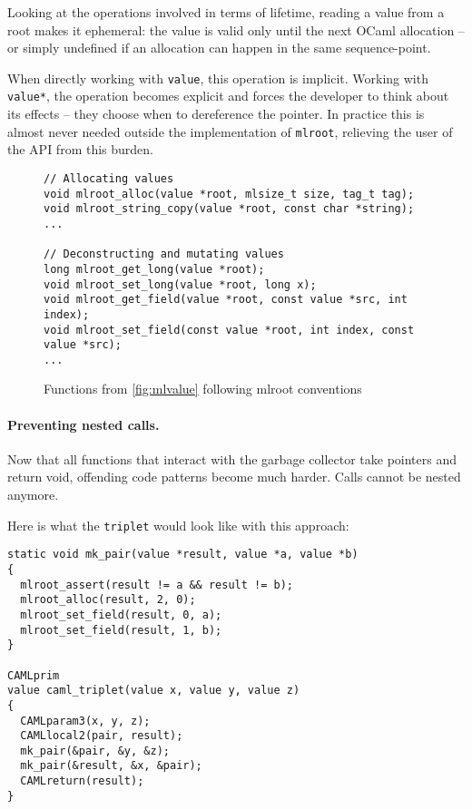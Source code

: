 \documentclass[a4paper]{easychair}
\newcommand{\cpp}[1]{\lstinline[style=C++]{#1}}
\begin{document}
Looking at the operations involved in terms of lifetime, reading a value
from a root makes it ephemeral: the value is valid only until the next
OCaml allocation -- or simply undefined if an allocation can happen in
the same sequence-point.

When directly working with \cpp{value}, this operation is implicit.
Working with \cpp{value*}, the operation becomes explicit and forces
the developer to think about its effects -- they choose when to
dereference the pointer.
In practice this is almost never needed outside the implementation of
\cpp{mlroot}, relieving the user of the API from this burden.

\begin{figure}[htbp]
\begin{lstlisting}[style=C++]
// Allocating values
void mlroot_alloc(value *root, mlsize_t size, tag_t tag);
void mlroot_string_copy(value *root, const char *string);
...
    
// Deconstructing and mutating values
long mlroot_get_long(value *root);
void mlroot_set_long(value *root, long x);
void mlroot_get_field(value *root, const value *src, int index);
void mlroot_set_field(const value *root, int index, const value *src);
...
\end{lstlisting}
  \caption{Functions from \ref{fig:mlvalue} following mlroot conventions}
  \label{fig:mlroot}
\end{figure}

\paragraph{Preventing nested calls.}

Now that all functions that interact with the garbage collector take pointers
and return void, offending code patterns become much harder. Calls cannot be
nested anymore.

Here is what the \cpp{triplet} would look like with this approach:
%
\begin{lstlisting}[style=C++]
static void mk_pair(value *result, value *a, value *b)
{
  mlroot_assert(result != a && result != b);
  mlroot_alloc(result, 2, 0);
  mlroot_set_field(result, 0, a);
  mlroot_set_field(result, 1, b);
}

CAMLprim
value caml_triplet(value x, value y, value z)
{
  CAMLparam3(x, y, z);
  CAMLlocal2(pair, result);
  mk_pair(&pair, &y, &z);
  mk_pair(&result, &x, &pair);
  CAMLreturn(result);
}
\end{lstlisting}
\end{document}
